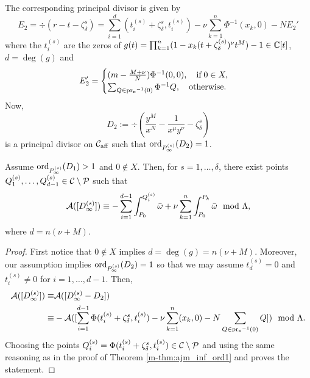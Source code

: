 \documentclass[main.tex]{subfiles}
\begin{document}
    The corresponding principal divisor is given by
     \begin{equation*}
      E_2 = \div(r - t - \zeta_{\delta}^s) = \sum_{i = 1}^{d} (t_i^{(s)}+\zeta_{\delta}^s,t_i^{(s)}) - \nu \sum_{k=1}^n
      \Phi^{-1}(x_k,0)- N E_2'
   \end{equation*}
      where the $t_i^{(s)}$ are the zeros of $g(t) = \prod_{k=1}^n (1-x_k(t+\zeta_{\delta}^{(s)})^{\nu}t^M) - 1 \in \mathbb{C}[t]$, $d = \deg(g)$ and
    \begin{equation}\label{eq:zero_bp2}
       E_2' = \begin{cases}
	   (m-\frac{M+\nu}{N}) \Phi^{-1}(0,0), \quad \text{if} \; 0 \in X, \\
             \sum_{Q \in \operatorname{pr_x}^{-1}(0)} \Phi^{-1}Q, \quad \text{otherwise.}
             \end{cases}
    \end{equation}
    Now, 
    \begin{equation*}
     D_2 := \div \left( \frac{y^M}{x^N} - \frac{1}{x^{\mu}y^{\nu}} - \zeta_{\delta}^s \right)
    \end{equation*}
    is a principal divisor on $\mathcal{C}_{\text{aff}}$ such that
    $\operatorname{ord}_{P_{\infty}^{(s)}}(D_2) = 1$.
    
    \begin{thm}\label{thm:ajm_inf_ordgt1}
      Assume $\operatorname{ord}_{P_{\infty}^{(s)}}(D_1) > 1$ and $0 \not\in X$. Then, for $s = 1,\dots,\delta$, there exist points $Q_1^{(s)},\dots,Q_{d-1}^{(s)} \in \mathcal{C} \setminus \mathcal{P}$ such that
    \begin{equation*}%
       \AJ( [D_{\infty}^{(s)}] ) \equiv -\sum_{i = 1}^{d-1} \int_{P_0}^{Q_i^{(s)}} \bar\w + \nu \sum_{k=1}^n
      \int_{P_0}^{P_k} \bar\w \mod \Lambda,
    \end{equation*}
    where $d = n(\nu+M)$.
    \end{thm}
   \begin{proof}
    First notice that $0 \not\in X$ implies $d = \deg(g) = n(\nu+M)$. Moreover, our assumption implies $\operatorname{ord}_{P_{\infty}^{(s)}}(D_2) = 1$ so that we may assume
    $t_d^{(s)} = 0$ and $t_i^{(s)} \ne 0$ for $i=1,\dots,d-1$. 	Then,
    \begin{align*}
     \mathcal{A}( [D_{\infty}^{(s)}] ) \equiv & \mathcal{A}([D_{\infty}^{(s)} - D_2]) \\
      \equiv & -\mathcal{A}( [\sum_{i = 1}^{d-1} \Phi(t_i^{(s)}+\zeta_{\delta}^s,t_i^{(s)}) - \nu \sum_{k=1}^n
      (x_k,0) - N \sum_{Q \in \operatorname{pr_x}^{-1}(0)} Q ] )
       \mod \Lambda.
    \end{align*}
   Choosing the points 
    $Q_i^{(s)} = \Phi(t_i^{(s)}+\zeta_{\delta}^s,t_i^{(s)}) \in \mathcal{C} \setminus \mathcal{P}$ and
     using the same reasoning as in the proof of Theorem \ref{m-thm:ajm_inf_ord1} and 
    proves the statement.
     \end{proof}
    
\end{document}
